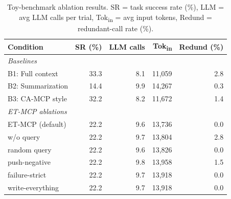 \begin{table}[t]
\centering
\caption{Toy-benchmark ablation results. SR = task success rate (\%), LLM = avg LLM calls per trial,
Tok\textsubscript{in} = avg input tokens, Redund = redundant-call rate (\%).}
\label{tab:toy-ablation}
\begin{tabular}{lrrrr}
\toprule
\textbf{Condition} & \textbf{SR (\%)} & \textbf{LLM calls} & \textbf{Tok\textsubscript{in}} & \textbf{Redund (\%)} \\
\midrule
\multicolumn{5}{l}{\textit{Baselines}} \\
B1: Full context          & 33.3 & 8.1  & 11{,}059 & 2.8 \\
B2: Summarization         & 14.4 & 9.9  & 14{,}267 & 0.3 \\
B3: CA-MCP style          & 32.2 & 8.2  & 11{,}672 & 1.4 \\
\midrule
\multicolumn{5}{l}{\textit{ET-MCP ablations}} \\
ET-MCP (default)          & 22.2 & 9.6  & 13{,}736 & 0.0 \\
\quad w/o query           & 22.2 & 9.7  & 13{,}804 & 2.8 \\
\quad random query        & 22.2 & 9.6  & 13{,}826 & 0.0 \\
\quad push-negative       & 22.2 & 9.8  & 13{,}958 & 1.5 \\
\quad failure-strict      & 22.2 & 9.7  & 13{,}918 & 0.0 \\
\quad write-everything    & 22.2 & 9.7  & 13{,}918 & 0.0 \\
\bottomrule
\end{tabular}
\end{table}
